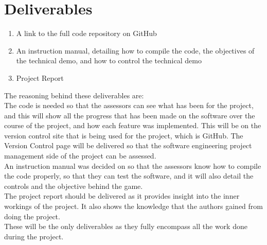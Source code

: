 

\section{Deliverables}
\begin{enumerate}
	\item A link to the full code repository on GitHub
	\item An instruction manual, detailing how to compile the code, the objectives of the technical demo, and how to control the technical demo
	\item Project Report
\end{enumerate}

The reasoning behind these deliverables are:\\
The code is needed so that the assessors can see what has been for the project, and this will show all the progress that has been made on the software over the course of the project, and how each feature was implemented. This will be on the version control site that is being used for the project, which is GitHub. The Version Control page will be delivered so that the software engineering project management side of the project can be assessed.\\
An instruction manual was decided on so that the assessors know how to compile the code properly, so that they can test the software, and it will also detail the controls and the objective behind the game.\\

The project report should be delivered as it provides insight into the inner workings of the project. It also shows the knowledge that the authors gained from doing the project.\\
These will be the only deliverables as they fully encompass all the work done during the project.\\
